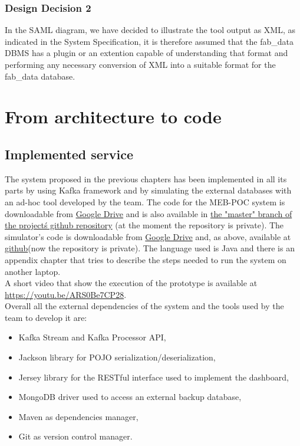 \subsubsection{Design Decision 2}
In the SAML diagram, we have decided to illustrate the tool output as XML, as indicated in the System Specification, it is therefore assumed that the fab\_data DBMS has a plugin or an extention capable of understanding that format and performing any necessary conversion of XML into a suitable format for the fab\_data database.
\newpage
\section{From architecture to code}

\subsection{Implemented service}
The system proposed in the previous chapters has been implemented in all its parts by using Kafka framework and by simulating the external databases with an ad-hoc tool developed by the team. The code for the MEB-POC system is downloadable from \href{https://drive.google.com/file/d/1CoNjQ_QpPEka4pH3k3aG3dxaqVhfUVZK/view?usp=sharing}{Google Drive} and is also available in \href{https://github.com/LuigiCerone/MEB-POC}{the "master" branch of the project\'s github repository} (at the moment the repository is private). The simulator's code is downloadable from \href{https://drive.google.com/file/d/1Qs3vJLEiLnZ-XM0G12GDj06ffdyb5ONJ/view?usp=sharing}{Google Drive} and, as above, available at \href{https://github.com/LuigiCerone/DBs\_Simulator}{github}(now the repository is private).
The language used is Java and there is an appendix chapter that tries to describe the steps needed to run the system on another laptop. \\
A short video that show the execution of the prototype is available at \\ \href{https://youtu.be/ARS0Be7CP28}{https://youtu.be/ARS0Be7CP28}. \\ 

Overall all the external dependencies of the system and the tools used by the team to develop it are:
\begin{itemize}
    \item Kafka Stream and Kafka Processor API,
    \item Jackson library for POJO serialization/deserialization,
    \item Jersey library for the RESTful interface used to implement the dashboard,
    \item MongoDB driver used to access an external backup database,
    \item Maven as dependencies manager,
    \item Git as version control manager.
\end{itemize}

